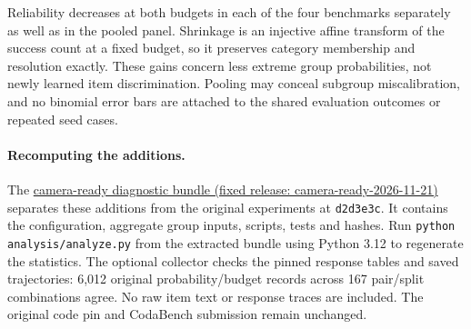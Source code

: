 \documentclass{article}
\begin{document}
Reliability decreases at both budgets in each of the four benchmarks
separately as well as in the pooled panel. Shrinkage is an injective affine
transform of the success count at a fixed budget, so it preserves category
membership and resolution exactly. These gains concern less extreme group
probabilities, not newly learned item discrimination. Pooling may conceal
subgroup miscalibration, and no binomial error bars are attached to the shared
evaluation outcomes or repeated seed cases.

\paragraph{Recomputing the additions.}
The \href{https://github.com/GioiaZheng/paiec-2026/releases/download/camera-ready-2026-11-21/paiec-camera-ready-source.zip}{camera-ready diagnostic bundle (fixed release: camera-ready-2026-11-21)}
separates these additions from the original experiments at \texttt{d2d3e3c}.
It contains the configuration, aggregate group inputs, scripts, tests and hashes.
Run \texttt{python analysis/analyze.py} from the extracted bundle using
Python 3.12 to regenerate the statistics. The optional collector checks the
pinned response tables and saved trajectories: 6,012 original probability/budget
records across 167 pair/split combinations agree. No raw item text or response
traces are included. The original code pin and CodaBench submission remain unchanged.
\end{document}
